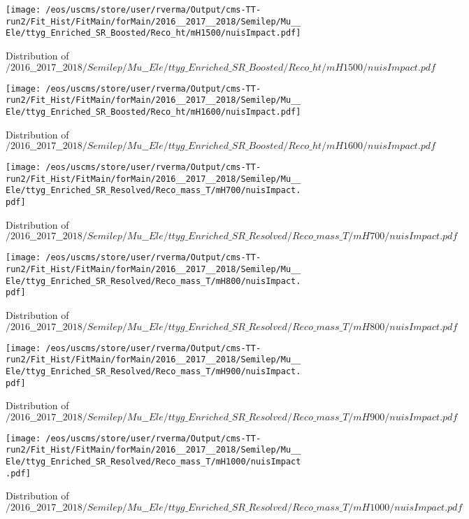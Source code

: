 \begin{figure}
\centering
\texttt{[image: /eos/uscms/store/user/rverma/Output/cms-TT-run2/Fit\_Hist/FitMain/forMain/2016\_\_2017\_\_2018/Semilep/Mu\_\_Ele/ttyg\_Enriched\_SR\_Boosted/Reco\_ht/mH1500/nuisImpact.pdf]}
\caption{Distribution of $/2016\_\_2017\_\_2018/Semilep/Mu\_\_Ele/ttyg\_Enriched\_SR\_Boosted/Reco\_ht/mH1500/nuisImpact.pdf$}
\end{figure}

\begin{figure}
\centering
\texttt{[image: /eos/uscms/store/user/rverma/Output/cms-TT-run2/Fit\_Hist/FitMain/forMain/2016\_\_2017\_\_2018/Semilep/Mu\_\_Ele/ttyg\_Enriched\_SR\_Boosted/Reco\_ht/mH1600/nuisImpact.pdf]}
\caption{Distribution of $/2016\_\_2017\_\_2018/Semilep/Mu\_\_Ele/ttyg\_Enriched\_SR\_Boosted/Reco\_ht/mH1600/nuisImpact.pdf$}
\end{figure}

\begin{figure}
\centering
\texttt{[image: /eos/uscms/store/user/rverma/Output/cms-TT-run2/Fit\_Hist/FitMain/forMain/2016\_\_2017\_\_2018/Semilep/Mu\_\_Ele/ttyg\_Enriched\_SR\_Resolved/Reco\_mass\_T/mH700/nuisImpact.pdf]}
\caption{Distribution of $/2016\_\_2017\_\_2018/Semilep/Mu\_\_Ele/ttyg\_Enriched\_SR\_Resolved/Reco\_mass\_T/mH700/nuisImpact.pdf$}
\end{figure}

\begin{figure}
\centering
\texttt{[image: /eos/uscms/store/user/rverma/Output/cms-TT-run2/Fit\_Hist/FitMain/forMain/2016\_\_2017\_\_2018/Semilep/Mu\_\_Ele/ttyg\_Enriched\_SR\_Resolved/Reco\_mass\_T/mH800/nuisImpact.pdf]}
\caption{Distribution of $/2016\_\_2017\_\_2018/Semilep/Mu\_\_Ele/ttyg\_Enriched\_SR\_Resolved/Reco\_mass\_T/mH800/nuisImpact.pdf$}
\end{figure}

\begin{figure}
\centering
\texttt{[image: /eos/uscms/store/user/rverma/Output/cms-TT-run2/Fit\_Hist/FitMain/forMain/2016\_\_2017\_\_2018/Semilep/Mu\_\_Ele/ttyg\_Enriched\_SR\_Resolved/Reco\_mass\_T/mH900/nuisImpact.pdf]}
\caption{Distribution of $/2016\_\_2017\_\_2018/Semilep/Mu\_\_Ele/ttyg\_Enriched\_SR\_Resolved/Reco\_mass\_T/mH900/nuisImpact.pdf$}
\end{figure}

\begin{figure}
\centering
\texttt{[image: /eos/uscms/store/user/rverma/Output/cms-TT-run2/Fit\_Hist/FitMain/forMain/2016\_\_2017\_\_2018/Semilep/Mu\_\_Ele/ttyg\_Enriched\_SR\_Resolved/Reco\_mass\_T/mH1000/nuisImpact.pdf]}
\caption{Distribution of $/2016\_\_2017\_\_2018/Semilep/Mu\_\_Ele/ttyg\_Enriched\_SR\_Resolved/Reco\_mass\_T/mH1000/nuisImpact.pdf$}
\end{figure}

